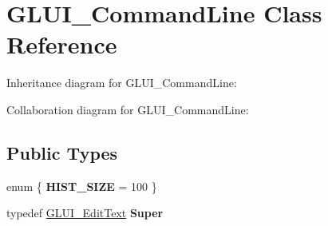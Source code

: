 \hypertarget{class_g_l_u_i___command_line}{\section{G\+L\+U\+I\+\_\+\+Command\+Line Class Reference}
\label{class_g_l_u_i___command_line}
}


Inheritance diagram for G\+L\+U\+I\+\_\+\+Command\+Line\+:


Collaboration diagram for G\+L\+U\+I\+\_\+\+Command\+Line\+:
\subsection*{Public Types}
\begin{DoxyCompactItemize}
\item 
\hypertarget{class_g_l_u_i___command_line_ab56a4ae0fe8d1ae08938903f024accd9}{enum \{ {\bfseries H\+I\+S\+T\+\_\+\+S\+I\+Z\+E} = 100
 \}}\label{class_g_l_u_i___command_line_ab56a4ae0fe8d1ae08938903f024accd9}

\item 
\hypertarget{class_g_l_u_i___command_line_af9db00326863efa876cbb5c6b2d255b7}{typedef \hyperlink{class_g_l_u_i___edit_text}{G\+L\+U\+I\+\_\+\+Edit\+Text} {\bfseries Super}}\label{class_g_l_u_i___command_line_af9db00326863efa876cbb5c6b2d255b7}

\end{DoxyCompactItemize}
